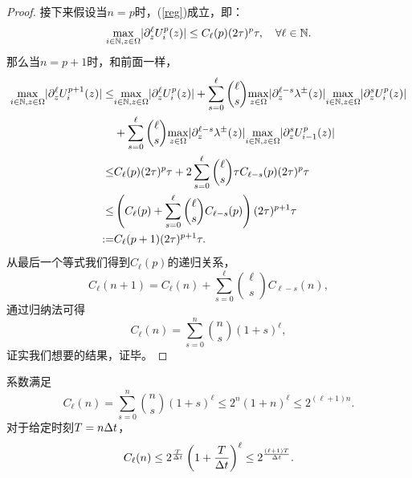 \begin{proof}
  接下来假设当$n=p$时，(\ref{reg})成立，即：
  \begin{equation}
    \underset{i\in\mathbb{N}, z\in\Omega}{\max}|\partial^{\ell}_z U^p_i(z)|\leq C_\ell(p)(2\tau)^p\tau, \quad\forall \ell\in\mathbb{N}.
  \end{equation}  
  那么当$n=p+1$时，和前面一样，
  \begin{equation}
    \begin{split}
      \underset{i\in\mathbb{N}, z\in\Omega}{\max}|\partial^{\ell}_z U^{p+1}_i(z)| \leq & {} \underset{i\in\mathbb{N}, z\in\Omega}{\max}|\partial^{\ell}_z U^p_i(z)| + \sum_{s = 0}^\ell\binom{\ell}{s}\underset{z\in\Omega}{\max}|\partial^{\ell-s}_z \lambda^{\pm}(z)|\underset{i\in\mathbb{N}, z\in\Omega}{\max}|\partial^{s}_z U^p_i(z)|
      \\
      & {} + \sum_{s = 0}^\ell\binom{\ell}{s}\underset{z\in\Omega}{\max}|\partial^{\ell-s}_z \lambda^{\pm}(z)|\underset{i\in\mathbb{N}, z\in\Omega}{\max}|\partial^{s}_z U^p_{i-1}(z)|
      \\
      \leq & {} C_\ell(p)(2\tau)^p\tau + 2\sum_{s=0}^\ell\binom{\ell}{s}\tau C_{\ell-s}(p)(2\tau)^p\tau
      \\
      \leq & {} \left(C_\ell(p) + \sum_{s=0}^\ell\binom{\ell}{s}C_{\ell-s}(p)\right)(2\tau)^{p+1}\tau
      \\
      := & {} C_\ell(p+1)(2\tau)^{p+1}\tau.
    \end{split}
  \end{equation}
  从最后一个等式我们得到$C_\ell(p)$的递归关系，
  \begin{equation}
    C_\ell(n+1) = C_\ell(n) + \sum\limits^\ell_{s=0}\binom{\ell}{s}C_{\ell-s}(n),
  \end{equation}
  通过归纳法可得
  \begin{equation}
    C_\ell(n) = \sum\limits^n_{s=0}\binom{n}{s}(1+s)^\ell,
  \end{equation}
  证实我们想要的结果，证毕。
\end{proof}
\begin{rem}
  系数满足
  \begin{equation}\label{Cnl}
    C_\ell(n) = \sum\limits^n_{s=0}\binom{n}{s}(1+s)^\ell \leq 2^n(1+n)^\ell\leq 2^{(\ell+1)n}.
  \end{equation}
  对于给定时刻$T = n\Delta t$，
  \begin{equation}
    C_\ell(n)\leq 2^{\frac{T}{\Delta t}}\left(1+\frac{T}{\Delta t}\right)^\ell\leq 2^{\frac{(\ell+1)T}{\Delta t}}.
  \end{equation}
\end{rem}

